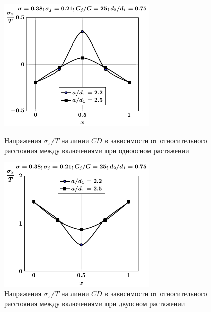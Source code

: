 \begin{figure}[h!]
\centering\footnotesize
\parbox[b]{7.5cm}{\centering\includegraphics[width=7.6cm]{inc13-a-d75-g25-t1-sig_x-cd.pdf}
\caption{Напряжения $\sigma_x/T$ на линии $CD$ в зависимости от относительного расстояния между включениями при одноосном растяжении
\label{f:9:81}}}\hfil\hfil
\parbox[b]{7.5cm}{\centering\includegraphics[width=7.6cm]{inc13-a-d75-g25-t2-sig_x-cd.pdf}
\caption{Напряжения $\sigma_x/T$ на линии $CD$ в зависимости от относительного расстояния между включениями при двуосном растяжении
\label{f:9:82}}}
\end{figure}

